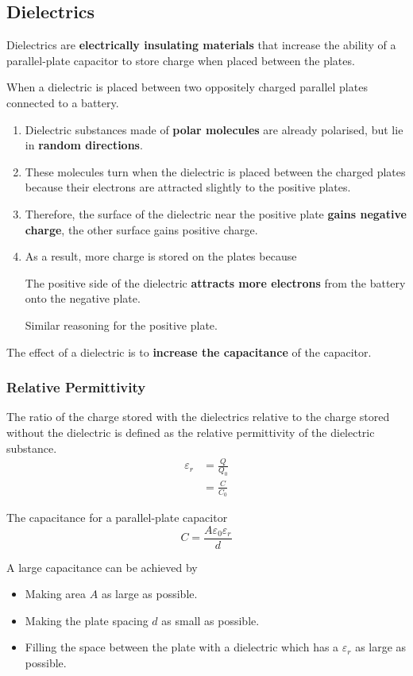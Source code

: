 \subsection{Dielectrics}

Dielectrics are \textbf{electrically insulating materials} that increase the ability of a parallel-plate capacitor to store charge when placed between the plates.

When a dielectric is placed between two oppositely charged parallel plates connected to a battery.
\begin{enumerate}
    \item Dielectric substances made of \textbf{polar molecules} are already polarised, but lie in \textbf{random directions}.
    \item These molecules turn when the dielectric is placed between the charged plates because their electrons are attracted slightly to the positive plates.
    \item Therefore, the surface of the dielectric near the positive plate \textbf{gains negative charge}, the other surface gains positive charge.
    \item As a result, more charge is stored on the plates because

        The positive side of the dielectric \textbf{attracts more electrons} from the battery onto the negative plate.

        Similar reasoning for the positive plate.
\end{enumerate}

The effect of a dielectric is to \textbf{increase the capacitance} of the capacitor.

\subsubsection*{Relative Permittivity}

The ratio of the charge stored with the dielectrics relative to the charge stored without the dielectric is defined as the relative permittivity of the dielectric substance.
\begin{align*}
    \varepsilon_r&=\frac{Q}{Q_0}\\
                 &=\frac{C}{C_0}
\end{align*}

The capacitance for a parallel-plate capacitor
$$C=\frac{A\varepsilon_0\varepsilon_r}{d}$$

A large capacitance can be achieved by
\begin{itemize}
    \item Making area $A$ as large as possible.
    \item Making the plate spacing $d$ as small as possible.
    \item Filling the space between the plate with a dielectric which has a $\varepsilon_r$ as large as possible.
\end{itemize}
